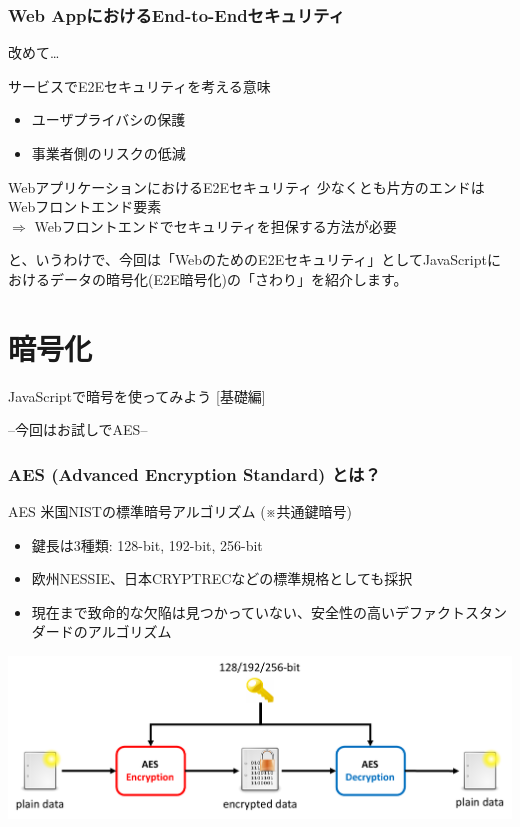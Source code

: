 \documentclass[12pt,dvipdfmx]{beamer}
\begin{document}
\begin{frame}
\frametitle{Web AppにおけるEnd-to-Endセキュリティ}
改めて…
\begin{block}{\small サービスでE2Eセキュリティを考える意味}
\begin{itemize}
 \item ユーザプライバシの保護
 \item 事業者側のリスクの低減
\end{itemize}
\end{block}

\begin{exampleblock}{\small WebアプリケーションにおけるE2Eセキュリティ}
少なくとも片方のエンドはWebフロントエンド要素\\
$\Rightarrow$ \alert{Webフロントエンドでセキュリティを担保する方法が必要}
\end{exampleblock}

\end{frame}

\begin{frame}
と、いうわけで、今回は「WebのためのE2Eセキュリティ」としてJavaScriptにおけるデータの暗号化(E2E暗号化)の「さわり」を紹介します。
\end{frame}

\section{暗号化}
\begin{frame}
\centering
{\Large JavaScriptで暗号を使ってみよう [基礎編]}

\vspace{1ex}
--今回はお試しでAES--

\end{frame}

\begin{frame}
\frametitle{AES (Advanced Encryption Standard) とは？}
\begin{block}{AES}
米国NISTの標準暗号アルゴリズム (※共通鍵暗号)\\
\begin{itemize}
 \item 鍵長は3種類: 128-bit, 192-bit, 256-bit
 \item 欧州NESSIE、日本CRYPTRECなどの標準規格としても採択
 \item 現在まで致命的な欠陥は見つかっていない、安全性の高い\alert{デファクトスタンダード}のアルゴリズム
\end{itemize}
\end{block}
\begin{center}
\includegraphics[width=0.9\linewidth]{Figs/aes_flow.pdf}
\end{center}
\end{frame}
\end{document}
